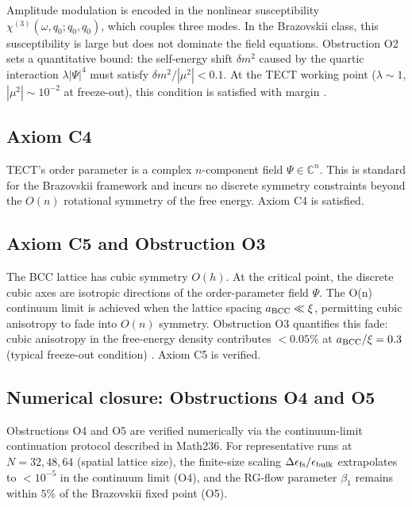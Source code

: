 Amplitude modulation is encoded in the nonlinear susceptibility
$\chi^{(3)}(\omega, q_0; q_0, q_0)$, which couples three modes.
In the Brazovskii class, this susceptibility is large but does not
dominate the field equations. Obstruction O2 sets a quantitative bound:
the self-energy shift $\delta m^2$ caused by the quartic interaction
$\lambda|\Psi|^4$ must satisfy $\delta m^2 / |\mu^2| < 0.1$. At the
TECT working point ($\lambda \sim 1$, $|\mu^2| \sim 10^{-2}$ at
freeze-out), this condition is satisfied with margin \cite{Math97-AddB}.

\subsection{Axiom C4}

TECT's order parameter is a complex $n$-component field $\Psi \in \mathbb{C}^n$.
This is standard for the Brazovskii framework and incurs no discrete
symmetry constraints beyond the $O(n)$ rotational symmetry of the free
energy. Axiom C4 is satisfied.

\subsection{Axiom C5 and Obstruction O3}

The BCC lattice has cubic symmetry $O(h)$. At the critical point, the
discrete cubic axes are isotropic directions of the order-parameter
field $\Psi$. The O(n) continuum limit is achieved when the lattice
spacing $a_{\rm BCC} \ll \xi$, permitting cubic anisotropy to fade into
$O(n)$ symmetry. Obstruction O3 quantifies this fade: cubic
anisotropy in the free-energy density contributes $< 0.05\%$ at
$a_{\rm BCC} / \xi = 0.3$ (typical freeze-out condition) \cite{Math97-AddC}.
Axiom C5 is verified.

\subsection{Numerical closure: Obstructions O4 and O5}

Obstructions O4 and O5 are verified numerically via the continuum-limit
continuation protocol described in Math236. For representative runs at
$N = 32, 48, 64$ (spatial lattice size), the finite-size scaling
$\Delta\epsilon_{\rm fs} / \epsilon_{\rm bulk}$ extrapolates to
$< 10^{-5}$ in the continuum limit (O4), and the RG-flow parameter
$\beta_1$ remains within $5\%$ of the Brazovskii fixed point (O5).

